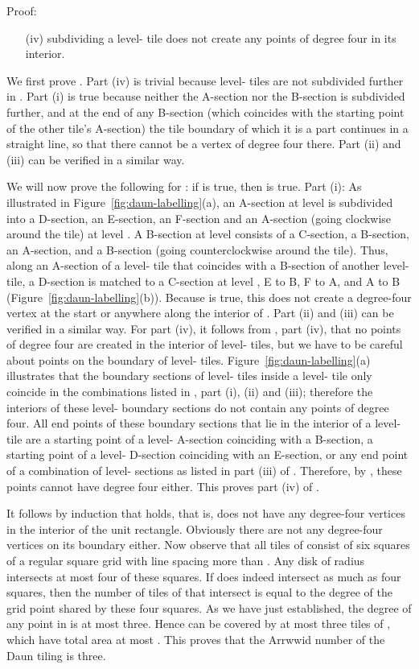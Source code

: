 \documentclass[11pt,a4paper]{article}
\newenvironment{proof}{Proof:}{\qed}
\def\squareforqed{\hbox{\rlap{}}}
\def\qed{\ifmmode\squareforqed\else{\unskip\nobreak\hfil
\penalty50\hskip1em\null\nobreak\hfil\squareforqed
\parfillskip=0pt\finalhyphendemerits=0\endgraf}\fi}
\begin{document}
\begin{proof}
\begin{itemize}
\item[(iv)] subdividing a level- tile does not create any points of degree four in its interior.
\end{itemize}
We first prove . Part (iv) is trivial because level- tiles are not subdivided further in . Part (i) is true because neither the A-section nor the B-section is subdivided further, and at the end of any B-section (which coincides with the starting point of the other tile's A-section) the tile boundary of which it is a part continues in a straight line, so that there cannot be a vertex of degree four there. Part (ii) and (iii) can be verified in a similar way.

We will now prove the following for : if  is true, then  is true. Part (i): As illustrated in Figure~\ref{fig:daun-labelling}(a), an A-section  at level  is subdivided into a D-section, an E-section, an F-section and an A-section (going clockwise around the tile) at level . A B-section at level  consists of a C-section, a B-section, an A-section, and a B-section (going counterclockwise around the tile). Thus, along an A-section of a level- tile that coincides with a B-section of another level- tile, a D-section is matched to a C-section at level , E to B, F to A, and A to B (Figure~\ref{fig:daun-labelling}(b)). Because  is true, this does not create a degree-four vertex at the start or anywhere along the interior of . Part (ii) and (iii) can be verified in a similar way. For part (iv), it follows from , part (iv), that no points of degree four are created in the interior of level- tiles, but we have to be careful about points on the boundary of level- tiles. Figure~\ref{fig:daun-labelling}(a) illustrates that the boundary sections of level- tiles inside a level- tile only coincide in the combinations listed in , part (i), (ii) and (iii); therefore the interiors of these level- boundary sections do not contain any points of degree four. All end points of these boundary sections that lie in the interior of a level- tile are a starting point of a level- A-section coinciding with a B-section, a starting point of a level- D-section coinciding with an E-section, or any end point of a combination of level- sections as listed in part (iii) of . Therefore, by , these points cannot have degree four either. This proves part (iv) of .

It follows by induction that  holds, that is,  does not have any degree-four vertices in the interior of the unit rectangle. Obviously there are not any degree-four vertices on its boundary either. Now observe that all tiles of  consist of six squares of a regular square grid with line spacing more than . Any disk  of radius  intersects at most four of these squares. If  does indeed intersect as much as four squares, then the number of tiles of  that intersect  is equal to the degree of the grid point  shared by these four squares. As we have just established, the degree of any point  in  is at most three. Hence  can be covered by at most three tiles of , which have total area at most . This proves that the Arrwwid number of the Daun tiling is three.
\end{proof}
\end{document}
